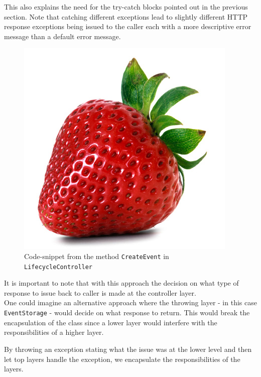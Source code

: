This also explains the need for the try-catch blocks pointed out in the previous section.  Note that catching different exceptions lead to slightly different HTTP response exceptions being issued to the caller each with a more descriptive error message than a default error message.

\begin{figure}[h!]
\centering
\includegraphics[width=0.3\linewidth]{figures/strawberry}
\caption{\label{fig:CreateEvent}Code-snippet from the method \texttt{CreateEvent} in \texttt{LifecycleController}}
\end{figure}

It is important to note that with this approach the decision on what type of response to issue back to caller is made at the controller layer. \\

One could imagine an alternative approach where the throwing layer - in this case \texttt{EventStorage} - would decide on what response to return. This would break the encapsulation of the class since a lower layer would interfere with the responsibilities of a higher layer. 

By throwing an exception stating what the issue was at the lower level and then let top layers handle the exception, we encapsulate the responsibilities of the layers.